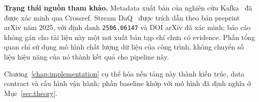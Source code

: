 \textbf{Trạng thái nguồn tham khảo.} Metadata xuất bản của nghiên cứu
Kafka~\cite{kafka_patterns_benchmark_2025} đã được xác minh qua Crossref.
Stream DaQ~\cite{stream_daq_2024} được trích dẫn theo bản preprint arXiv
năm 2025, với định danh \texttt{2506.06147} và DOI arXiv đã xác minh; báo
cáo không gán cho tài liệu này một nơi xuất bản tạp chí chưa có evidence.
Phần tổng quan chỉ sử dụng mô hình chất lượng dữ liệu của công trình,
không chuyển số liệu hiệu năng của nó thành kết quả cho pipeline này.

Chương~\ref{chap:implementation} cụ thể hóa nền tảng này thành kiến trúc,
data contract và cấu hình vận hành; phần baseline khớp với mô hình
đã định nghĩa ở Mục~\ref{sec:theory}.
